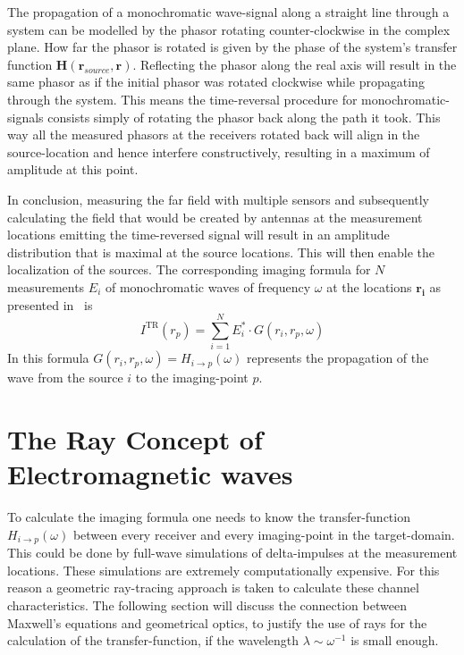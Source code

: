 The propagation of a monochromatic wave-signal along a straight line through a system can be modelled by the phasor rotating counter-clockwise in the complex plane.
How far the phasor is rotated is given by the phase of the system's transfer function \(\bm{H}(\bm{r}_{source}, \bm{r})\).
Reflecting the phasor along the real axis will result in the same phasor as if the initial phasor was rotated clockwise while propagating through the system.
This means the time-reversal procedure for monochromatic-signals consists simply of rotating the phasor back along the path it took.
This way all the measured phasors at the receivers rotated back will align in the source-location and hence interfere constructively, resulting in a maximum of amplitude at this point.  

\vspace{1cm}
In conclusion, measuring the far field with multiple sensors and subsequently calculating the field that would be created by antennas at the measurement locations emitting the time-reversed signal will result in an amplitude distribution that is maximal at the source locations.
This will then enable the localization of the sources. 
The corresponding imaging formula for \(N\) measurements \(E_i\) of monochromatic waves of frequency \(\omega \) at the locations \(\bm{r_i}\) as presented in~\parencite{peng_zhang_comparison_2013} is
\begin{equation}
    I^{\mathrm{\text{TR}}}\left(r_p\right)=\sum_{i=1}^N E_{i}^* \cdot G\left(r_i, r_p, \omega\right)
\end{equation}
In this formula \(G(r_i, r_p, \omega) = H_{i\rightarrow p}(\omega)\) represents the propagation of the wave from the source \(i\) to the imaging-point \(p\).



\section{The Ray Concept of Electromagnetic waves}\label{sec:ray-concept}
To calculate the imaging formula one needs to know the transfer-function \(H_{i\rightarrow p}(\omega)\) between every receiver and every imaging-point in the target-domain.
This could be done by full-wave simulations of delta-impulses at the measurement locations.
These simulations are extremely computationally expensive.
For this reason a geometric ray-tracing approach is taken to calculate these channel characteristics.
The following section will discuss the connection between Maxwell's equations and geometrical optics, to justify the use of rays for the calculation of the transfer-function, if the wavelength \(\lambda \sim \omega^{-1} \) is small enough.

